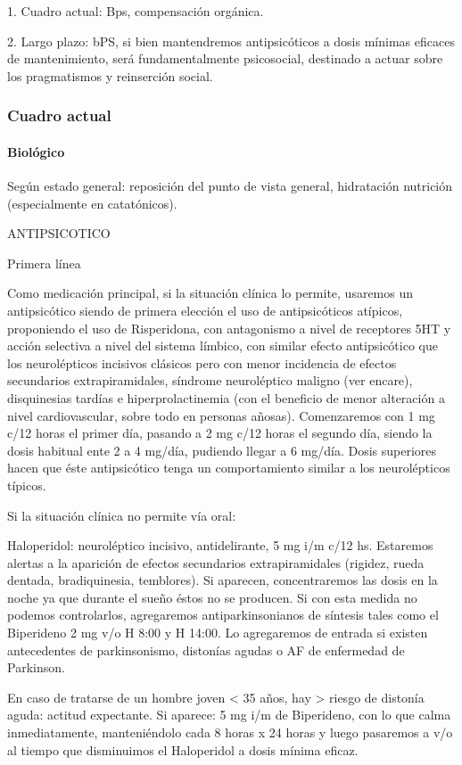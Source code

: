 1. Cuadro actual: Bps, compensación orgánica.

2. Largo plazo: bPS, si bien mantendremos antipsicóticos a dosis mínimas eficaces de mantenimiento, será fundamentalmente psicosocial, destinado a actuar sobre los pragmatismos y reinserción social.
\subsubsection*{Cuadro actual}
\paragraph*{Biológico}
Según estado general: reposición del punto de vista general, hidratación nutrición (especialmente en catatónicos).

ANTIPSICOTICO

Primera línea

Como medicación principal, si la situación clínica lo permite, usaremos un antipsicótico siendo de primera elección el uso de antipsicóticos atípicos, proponiendo el uso de Risperidona, con antagonismo a nivel de receptores 5HT y acción selectiva a nivel del sistema límbico, con similar efecto antipsicótico que los neurolépticos incisivos clásicos pero con menor incidencia de efectos secundarios extrapiramidales, síndrome neuroléptico maligno (ver encare), disquinesias tardías e hiperprolactinemia (con el beneficio de menor alteración a nivel cardiovascular, sobre todo en personas añosas). Comenzaremos con 1 mg c/12 horas el primer día, pasando a 2 mg c/12 horas el segundo día, siendo la dosis habitual ente 2 a 4 mg/día, pudiendo llegar a 6 mg/día. Dosis superiores hacen que éste antipsicótico tenga un comportamiento similar a los neurolépticos típicos.

Si la situación clínica no permite vía oral:

Haloperidol: neuroléptico incisivo, antidelirante, 5 mg i/m c/12 hs. Estaremos alertas a la aparición de efectos secundarios extrapiramidales (rigidez, rueda dentada, bradiquinesia, temblores). Si aparecen, concentraremos las dosis en la noche ya que durante el sueño éstos no se producen. Si con esta medida no podemos controlarlos, agregaremos antiparkinsonianos de síntesis tales como el Biperideno 2 mg v/o H 8:00 y H 14:00. Lo agregaremos de entrada si existen antecedentes de parkinsonismo, distonías agudas o AF de enfermedad de Parkinson.

En caso de tratarse de un hombre joven < 35 años, hay > riesgo de distonía aguda: actitud expectante. Si aparece: 5 mg i/m de Biperideno, con lo que calma inmediatamente, manteniéndolo cada 8 horas x 24 horas y luego pasaremos a v/o al tiempo que disminuimos el Haloperidol a dosis mínima eficaz.

